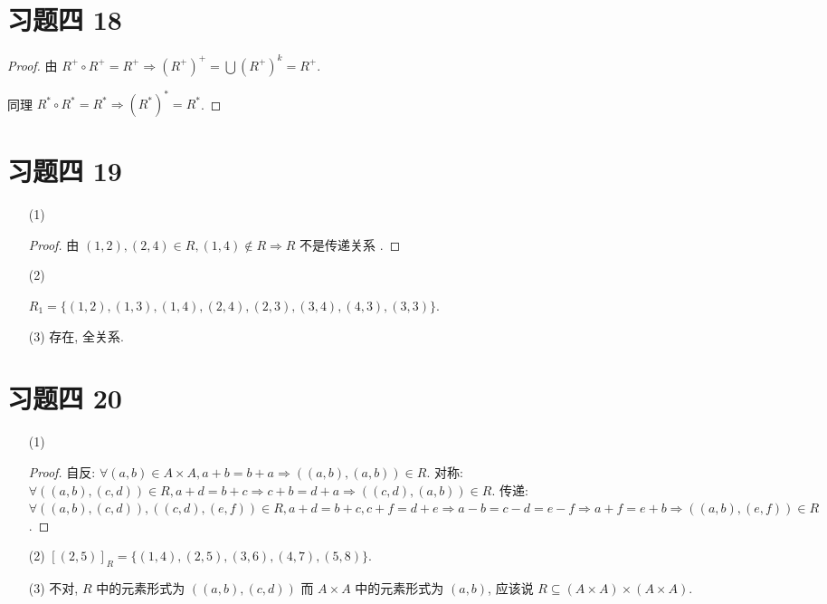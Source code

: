 \section{习题四 18}

\begin{proof}
	由 $R^+\circ R^+=R^+ \Rightarrow (R^+)^+=\bigcup (R^+)^k=R^+$.
	
	同理 $R^*\circ R^*=R^*\Rightarrow (R^*)^*=R^*$.
\end{proof}

\section{习题四 19}
\begin{itemize}
	\item[(1)]
	\begin{proof}
		由 $(1,2),(2,4) \in R,(1,4) \notin R\Rightarrow R$ 不是传递关系 .
\end{proof}
	\item[(2)] 
	\begin{solution}
		$R_1=\{(1,2),(1,3),(1,4),(2,4),(2,3),(3,4),(4,3),(3,3)\}$.
	\end{solution}
	\item[(3)] 存在, 全关系.
\end{itemize}

\section{习题四 20}

\begin{itemize}
	
	\item[(1)] 
	\begin{proof}
		自反: $\forall (a,b) \in A\times A,a+b=b+a\Rightarrow ((a,b),(a,b)) \in R$.
		对称: $\forall ((a,b),(c,d))\in R,a+d=b+c \Rightarrow c+b=d+a\Rightarrow ((c,d),(a,b)) \in R$.
		传递: $\forall ((a,b),(c,d)),((c,d),(e,f))\in R,a+d=b+c,c+f=d+e\Rightarrow a-b=c-d=e-f\Rightarrow a+f=e+b\Rightarrow((a,b),(e,f))\in R$.
	\end{proof}
	
	\item[(2)] $[(2,5)]_R=\{(1,4),(2,5),(3,6),(4,7),(5,8)\}$.
	
	\item[(3)] 不对, $R$ 中的元素形式为 $((a,b),(c,d))$ 而 $A\times A$ 中的元素形式为 $(a,b)$, 应该说 $R\subseteq (A\times A)\times(A\times A)$.
\end{itemize}


